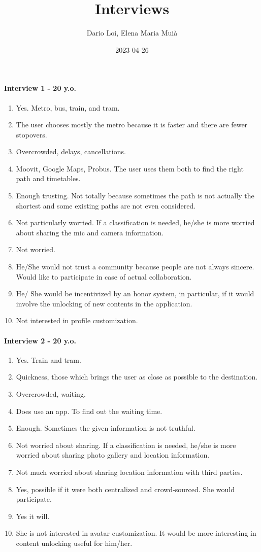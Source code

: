 \documentclass[a4paper, 10pt]{IEEEtran}
\title{Interviews}
\author{Dario Loi, Elena Maria Muià}
\date{2023-04-26}
\begin{document}
\maketitle
\paragraph*{Interview 1 - 20 y.o.}
\begin{enumerate}
    \item Yes. Metro, bus, train, and tram.
    \item The user chooses mostly the metro because it is faster and there are fewer stopovers.
    \item Overcrowded, delays, cancellations.
    \item Moovit, Google Maps, Probus. The user uses them both to find the right path and timetables.
    \item Enough trusting. Not totally because sometimes the path is not actually the shortest and some existing paths are not even considered.
    \item Not particularly worried. If a classification is needed, he/she is more worried about sharing the mic and camera information.
    \item Not worried.
    \item He/She would not trust a community because people are not always sincere. Would like to participate in case of actual collaboration.
    \item He/ She would be incentivized by an honor system, in particular, if it would involve the unlocking of new contents in the application.
    \item Not interested in profile customization.

\end{enumerate}

\paragraph*{Interview 2 - 20 y.o.}
\begin{enumerate}
    \item Yes. Train and tram.
    \item Quickness, those which brings the user as close as possible to the destination.
    \item Overcrowded, waiting.
    \item Does use an app. To find out the waiting time.
    \item Enough. Sometimes the given information is not truthful.
    \item Not worried about sharing. If a classification is needed, he/she is more worried about sharing photo gallery and location information.
    \item Not much worried about sharing location information with third parties.
    \item Yes, possible if it were both centralized and crowd-sourced. She would participate.
    \item Yes it will.
    \item She is not interested in avatar customization. It would be more interesting in content unlocking useful for him/her.
\end{enumerate}
\end{document}
